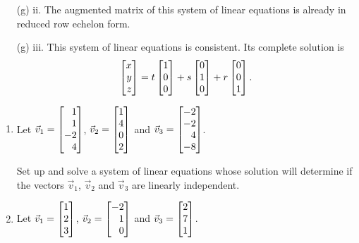 \begin{exercises}
\begin{problist}
\begin{solution}
\begin{enumerate}
				\item[(g) ii.]
				The augmented matrix of this system of linear equations is already in reduced row echelon form.
				\item[(g) iii.]
				This system of linear equations is consistent. Its complete solution is
				\[
					\mat{x\\y\\z}=t\mat{1\\0\\0}+s\mat{0\\1\\0}+r\mat{0\\0\\1}.
				\]
			\end{enumerate}
		\end{solution}

		\prob 
		\label{QSETUPEQUATIONS}
		\begin{enumerate}
			\item Let $\vec v_{1}=\mat{1\\1\\-2\\4}$,
			$\vec v_{2}=\mat{1\\4\\0\\2}$ and
			$\vec v_{3}=\mat{-2\\-2\\4\\-8}$.
			
			Set up and solve a system of linear equations whose solution
			will determine if the vectors $\vec v_{1}$, $\vec v_{2}$ and $\vec
			v_{3}$ are linearly independent.
			
			\item Let $\vec v_{1}=\mat{1\\2\\3}$, $\vec v_{2}=\mat{-2\\1\\0}$
			and $\vec v_{3}=\mat{2\\7\\1}$.
			

\end{enumerate}
\end{problist}
\end{exercises}
